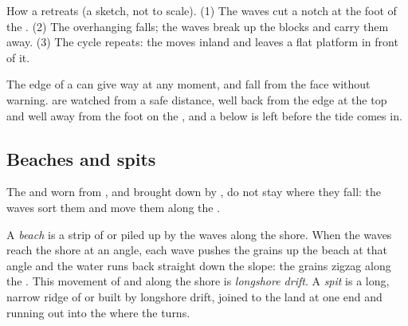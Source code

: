 \begin{omfigure}
{\small How a   retreats (a sketch, not to scale). (1) The waves
cut a notch at the foot of the . (2) The overhanging  falls; the
waves break up the blocks and carry them away. (3) The cycle repeats: the
 moves inland and leaves a flat  platform in front of it.}
\label{fig:g9:landforms:cliff-retreat}
\end{omfigure}

\begin{safety}
The edge of a  can give way at any moment, and  fall from the
face without warning.  are watched from a safe distance, well back
from the edge at the top and well away from the foot on the , and a
 below  is left before the tide comes in.
\end{safety}

\subsection{Beaches and spits}

The  and  worn from , and brought down by , do not
stay where they fall: the waves sort them and move them along the .

\begin{definition}\label{def:g9:landforms:beach}
A \emph{beach} is a strip of  or  piled up by the
waves along the shore. When the waves reach the shore at an angle, each
wave pushes the grains up the beach at that angle and the water runs back
straight down the slope: the grains zigzag along the . This movement
of  and  along the shore is \emph{longshore
drift}. A \emph{spit} is a long, narrow
ridge of  or  built by longshore drift, joined to the land at
one end and running out into the  where the  turns.
\end{definition}

